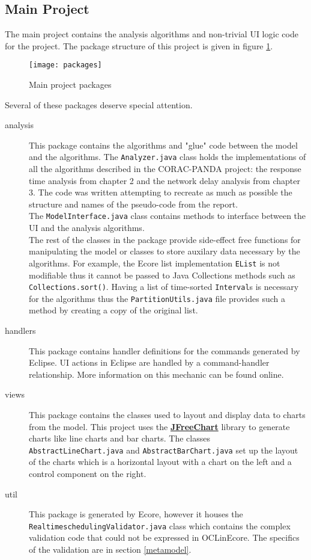 \subsection{Main Project}
The main project contains the analysis algorithms and non-trivial UI logic code for the 
project. The package structure of this project is given in figure \ref{fig:packages}.
\begin{figure}[h]
    \texttt{[image: packages]}
    \caption{Main project packages}
    \label{fig:packages}
\end{figure}
Several of these packages deserve special attention.
\begin{description}
    \item[analysis] This package contains the algorithms and "glue" code between the model and the
    algorithms. The \texttt{Analyzer.java} class holds the implementations of all the algorithms
    described in the CORAC-PANDA project: the response time analysis from chapter 2 and the
    network delay analysis from chapter 3. The code was written attempting to recreate as much
    as possible the structure and names of the pseudo-code from the report. 
    \\
    The \texttt{ModelInterface.java} class contains methods to interface between the UI and the
    analysis algorithms.
    \\
    The rest of the classes in the package provide side-effect free functions for manipulating
    the model or classes to store auxilary data necessary by the algorithms.
    For example, the Ecore list implementation \texttt{EList} is not modifiable
    thus it cannot be passed to Java Collections methods such as \texttt{Collections.sort()}.
    Having a list of time-sorted \texttt{Interval}s is necessary for the algorithms thus
    the \texttt{PartitionUtils.java} file provides such a method by creating a copy of the original
    list.
    \item[handlers] This package contains handler definitions for the commands generated by
    Eclipse. UI actions in Eclipse are handled by a command-handler relationship. More information
    on this mechanic can be found online.
    \item[views] This package contains the classes used to layout and display data to charts from 
    the model. This project uses the \href{http://www.jfree.org/jfreechart/}{\textbf{JFreeChart}}
    library to generate charts like line charts and bar charts. The classes \texttt{AbstractLineChart.java} 
    and \texttt{AbstractBarChart.java} set up the layout of the charts which is a horizontal layout
    with a chart on the left and a control component on the right. 
    \item[util] This package is generated by Ecore, however it houses the \texttt{RealtimeschedulingValidator.java}     class which contains the complex validation code that could not be expressed in OCLinEcore. The specifics
    of the validation are in section \ref{metamodel}.
\end{description}
